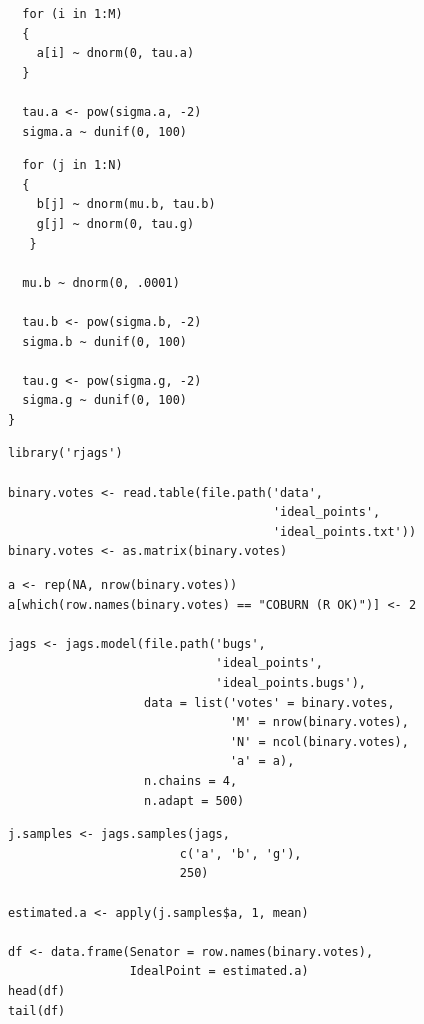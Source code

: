 \documentclass{beamer}
\begin{document}
\begin{frame}[fragile]
  \begin{verbatim}
  for (i in 1:M)
  {
    a[i] ~ dnorm(0, tau.a)
  }

  tau.a <- pow(sigma.a, -2)
  sigma.a ~ dunif(0, 100)
  \end{verbatim}
\end{frame}

\begin{frame}[fragile]
  \begin{verbatim}
  for (j in 1:N)
  {
    b[j] ~ dnorm(mu.b, tau.b)
    g[j] ~ dnorm(0, tau.g)
   }

  mu.b ~ dnorm(0, .0001)

  tau.b <- pow(sigma.b, -2)
  sigma.b ~ dunif(0, 100)

  tau.g <- pow(sigma.g, -2)
  sigma.g ~ dunif(0, 100)
}
  \end{verbatim}
\end{frame}

\begin{frame}[fragile]
  \begin{verbatim}
library('rjags')

binary.votes <- read.table(file.path('data',
                                     'ideal_points',
                                     'ideal_points.txt'))
binary.votes <- as.matrix(binary.votes)
  \end{verbatim}
\end{frame}

\begin{frame}[fragile]
  \begin{verbatim}
a <- rep(NA, nrow(binary.votes))
a[which(row.names(binary.votes) == "COBURN (R OK)")] <- 2

jags <- jags.model(file.path('bugs',
                             'ideal_points',
                             'ideal_points.bugs'),
                   data = list('votes' = binary.votes,
                               'M' = nrow(binary.votes),
                               'N' = ncol(binary.votes),
                               'a' = a),
                   n.chains = 4,
                   n.adapt = 500)
  \end{verbatim}
\end{frame}

\begin{frame}[fragile]
  \begin{verbatim}
j.samples <- jags.samples(jags,
                        c('a', 'b', 'g'),
                        250)

estimated.a <- apply(j.samples$a, 1, mean)

df <- data.frame(Senator = row.names(binary.votes),
                 IdealPoint = estimated.a)
head(df)
tail(df)
  \end{verbatim}
\end{frame}
\end{document}
